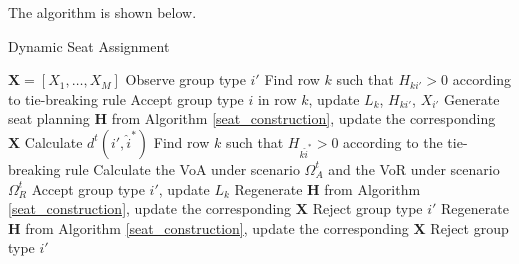 


The algorithm is shown below.

\begin{algorithm}[H]
  \caption{Dynamic Seat Assignment}
  $\bm{X} = [X_1, \ldots, X_M]$\;
  {Observe group type ${i{'}}$\;
    {Find row $k$ such that $H_{k{i{'}}} >0$ according to tie-breaking rule\; 
    Accept group type $i$ in row $k$, update $L_{k}$, $H_{k{i{'}}}$, $X_{i{'}}$\;
    {Generate seat planning $\bm{H}$ from Algorithm \ref{seat_construction}, update the corresponding $\bm{X}$\;}}
    {Calculate $d^{t}({i{'}}, \hat{i}^{*})$\;
    {Find row $k$ such that $H_{k \hat{i}^{*}} > 0$ according to the tie-breaking rule\; 
    Calculate the VoA under scenario $\Omega^{t}_{A}$ and the VoR under scenario $\Omega^{t}_{R}$\;
    {Accept group type ${i{'}}$, update $L_{k}$\; 
    Regenerate $\bm{H}$ from Algorithm \ref{seat_construction}, update the corresponding $\bm{X}$\;}
    {Reject group type ${i{'}}$\; 
    Regenerate $\bm{H}$ from Algorithm \ref{seat_construction}, update the corresponding $\bm{X}$\;}}
    {Reject group type ${i{'}}$\;}
    }}
\end{algorithm}

 
